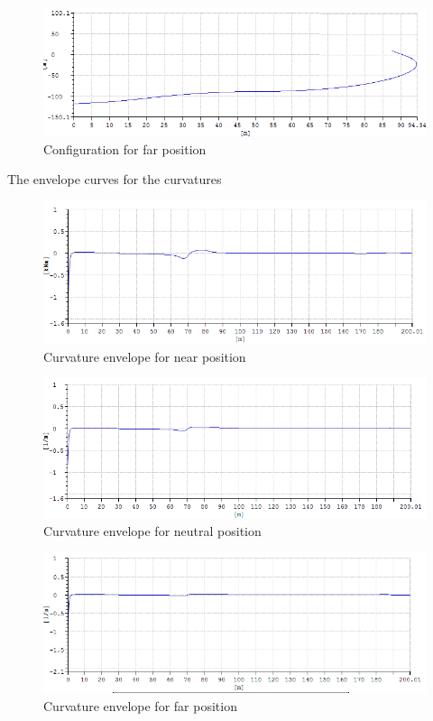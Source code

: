 \begin{figure}[H]
\centering
\includegraphics[scale=0.5]{figures/configfarc}
\caption{Configuration for far position}
 \label{fig:configfar}
\end{figure}

\noindent The envelope curves for the curvatures

\begin{figure}[H]
\centering
\includegraphics[scale=0.5]{figures/envcurvenear}
\caption{Curvature envelope for near position}
 \label{fig:envcurvenear}
\end{figure}

\begin{figure}[H]
\centering
\includegraphics[scale=0.5]{figures/envcurveneu}
\caption{Curvature envelope for neutral position}
 \label{fig:envcurveneu}
\end{figure}

\begin{figure}[H]
\centering
\includegraphics[scale=0.5]{figures/envcurvefar}
\caption{Curvature envelope for far position}
 \label{fig:envcurvefar}
\end{figure}

